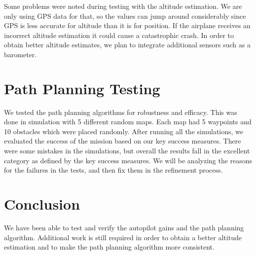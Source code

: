 \documentclass[]{auvsi_doc}
\begin{document}
Some problems were noted during testing with the altitude estimation. We are only using GPS data for that, so the values can jump around considerably since GPS is less accurate for altitude than it is for position. If the airplane receives an incorrect altitude estimation it could cause a catastrophic crash. In order to obtain better altitude estimates, we plan to integrate additional sensors such as a barometer. 

\section{Path Planning Testing}

We tested the path planning algorithms for robustness and efficacy. This was done in simulation with 5 different random maps. Each map had 5 waypoints and 10 obstacles which were placed randomly. After running all the simulations, we evaluated the success of the mission based on our key success measures. There were some mistakes in the simulations, but overall the results fall in the excellent category as defined by the key success measures. We will be analyzing the reasons for the failures in the tests, and then fix them in the refinement process.

\section{Conclusion}

We have been able to test and verify the autopilot gains and the path planning algorithm. Additional work is still required in order to obtain a better altitude estimation and to make the path planning algorithm more consistent.
\end{document}
